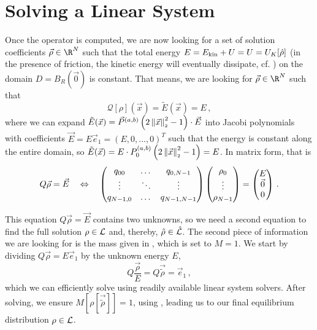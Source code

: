 \section{Solving a Linear System}
Once the operator is computed, we are now looking for a set of solution coefficients $\vec{\rho} \in \R^N$ such that the total energy $E = E_{\rm kin} + U = U = U_K[\hat{\rho}]$ (in the presence of friction, the kinetic energy will eventually dissipate, cf. ) on the domain $D = B_R(\vec{0})$ is constant.
That means, we are looking for $\vec{\rho} \in \R^N$ such that
\begin{equation}
  \mathcal{Q}[\rho](\vec{x}) = \tilde{E}(\vec{x}) = E\,,
\end{equation}
where we can expand $\tilde{E}(\vec{x}) = \vec{P}^{(a, b)}\left(2 \left\lVert\vec{x}\right\rVert_{\scriptscriptstyle 2}^2 - 1\right) \cdot \vec{E}$ into Jacobi polynomials with coefficients $\vec{E} = E \vec{e}_1 = (E, 0, ..., 0)^T$ such that the energy is constant along the entire domain, so $\tilde{E}(\vec{x}) = E \cdot P_0^{(a, b)}\left(2 \left\lVert\vec{x}\right\rVert_{\scriptscriptstyle 2}^2 - 1\right) = E$.
In matrix form, that is
$$Q \vec{\rho} = \vec{E} \quad\Leftrightarrow\quad \begin{pmatrix}
    q_{00}    & \dots  & q_{0,N-1}   \\
    \vdots    & \ddots & \vdots      \\
    q_{N-1,0} & \dots  & q_{N-1,N-1} \\
  \end{pmatrix} \begin{pmatrix}
    \rho_0 \\
    \vdots \\
    \rho_{N-1}
  \end{pmatrix} = \begin{pmatrix}
    E       \\
    \vec{0} \\
    0
  \end{pmatrix}\,.$$

This equation $Q \vec{\rho} = \vec{E}$ contains two unknowns, so we need a second equation to find the full solution $\rho \in \mathcal{L}$ and, thereby, $\hat{\rho} \in \hat{\mathcal{L}}$.
The second piece of information we are looking for is the mass given in , which is set to $M = 1$. We start by dividing $Q \vec{\rho} = E \vec{e}_1$ by the unknown energy $E$,
\begin{equation}
  Q \frac{\vec{\rho}}{E} = Q \vec{\tilde{\rho}} = \vec{e}_1\,,
  \label{eq:the-linear-system}
\end{equation}
which we can efficiently solve using readily available linear system solvers.
After solving, we ensure $M\left[\rho[\vec{\tilde{\rho}}]\right] = 1$, using , leading us to our final equilibrium distribution $\rho \in \mathcal{L}$.

